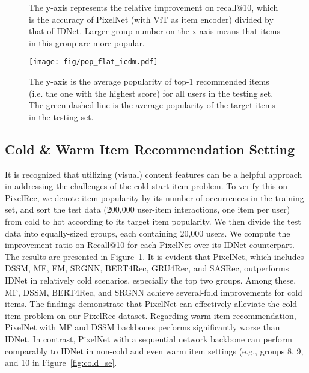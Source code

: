 \documentclass[sigconf]{acmart}
\begin{document}
	\begin{figure}
		\centering
  \hspace{-0.4cm} 
	\caption{The y-axis represents the relative improvement on recall@10, which is the accuracy of PixelNet (with ViT as item encoder) divided by that of IDNet. Larger group number on the x-axis means that items in this group are more popular.}
	\label{fig:cold}
\end{figure}
\begin{figure}[t]
	\centering
	\texttt{[image: fig/pop\_flat\_icdm.pdf]}
	\caption{The y-axis is the average popularity of top-1 recommended items (i.e. the one with the highest score) for all users in the testing set. 
 The green dashed line is the average popularity of the target items in the testing set.}
	\label{fig:pop}	
\end{figure}
\subsection{Cold \& Warm Item Recommendation Setting }
It is recognized that utilizing (visual) content features can be a helpful approach in addressing the challenges of the cold start item problem.
To verify this on PixelRec, we denote item popularity by its number of occurrences in the training set, and sort the test data (200,000 user-item interactions, one item per user) from cold to hot according to its target item popularity. We then divide the test data into equally-sized groups, each containing 20,000 users. We compute the  improvement ratio on Recall@10 for each PixelNet over its IDNet counterpart. The results are presented in Figure~\ref{fig:cold}. It is evident that PixelNet, which includes DSSM, MF, FM, SRGNN, BERT4Rec, GRU4Rec, and SASRec, outperforms IDNet in relatively cold scenarios, especially the top two groups. Among these, MF, DSSM, BERT4Rec, and SRGNN achieve several-fold improvements for cold items. 
The findings demonstrate that PixelNet can effectively alleviate the cold-item problem on our PixelRec dataset. Regarding warm item recommendation, PixelNet with MF and DSSM backbones  performs significantly worse than IDNet.
In contrast, PixelNet with a sequential network backbone can perform comparably to IDNet in non-cold and even warm item settings (e.g., groups 8, 9, and 10 in Figure~\ref{fig:cold_se}.
\end{document}
